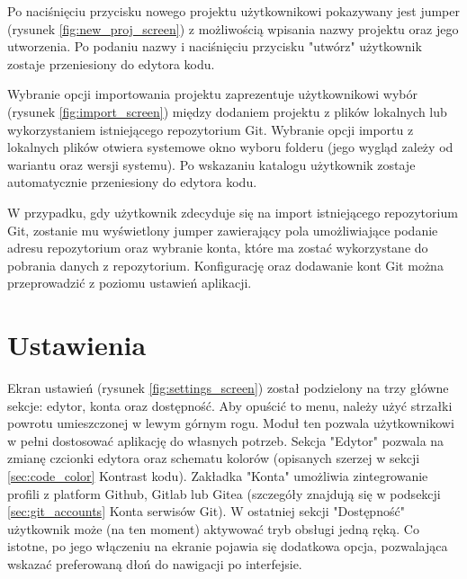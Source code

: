 Po naciśnięciu przycisku nowego projektu użytkownikowi pokazywany jest jumper (rysunek \ref{fig:new_proj_screen}) z możliwością wpisania nazwy projektu oraz jego utworzenia. Po podaniu nazwy i naciśnięciu przycisku "utwórz" użytkownik zostaje przeniesiony do edytora kodu.

Wybranie opcji importowania projektu zaprezentuje użytkownikowi wybór (rysunek \ref{fig:import_screen}) między dodaniem projektu z plików lokalnych lub wykorzystaniem istniejącego repozytorium Git. 
\newline\newline
Wybranie opcji importu z lokalnych plików otwiera systemowe okno wyboru folderu (jego wygląd zależy od wariantu oraz wersji systemu). Po wskazaniu katalogu użytkownik zostaje automatycznie przeniesiony do edytora kodu.

W przypadku, gdy użytkownik zdecyduje się na import istniejącego repozytorium Git, zostanie mu wyświetlony jumper zawierający pola umożliwiające podanie adresu repozytorium oraz wybranie konta, które ma zostać wykorzystane do pobrania danych z repozytorium. Konfigurację oraz dodawanie kont Git można przeprowadzić z poziomu ustawień aplikacji.

\section{Ustawienia}
\label{sec:settings}

Ekran ustawień (rysunek \ref{fig:settings_screen}) został podzielony na trzy główne sekcje: edytor, konta oraz dostępność. Aby opuścić to menu, należy użyć strzałki powrotu umieszczonej w lewym górnym rogu. Moduł ten pozwala użytkownikowi w pełni dostosować aplikację do własnych potrzeb.
\newline\newline
Sekcja "Edytor" pozwala na zmianę czcionki edytora oraz schematu kolorów (opisanych szerzej w sekcji \ref{sec:code_color} Kontrast kodu). Zakładka "Konta" umożliwia zintegrowanie profili z platform Github, Gitlab lub Gitea (szczegóły znajdują się w podsekcji \ref{sec:git_accounts} Konta serwisów Git). W ostatniej sekcji "Dostępność" użytkownik może (na ten moment) aktywować tryb obsługi jedną ręką. Co istotne, po jego włączeniu na ekranie pojawia się dodatkowa opcja, pozwalająca wskazać preferowaną dłoń do nawigacji po interfejsie.

